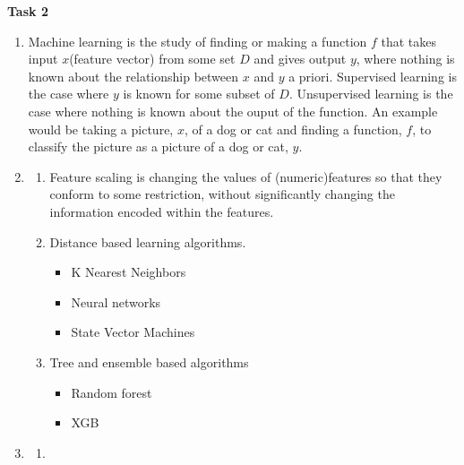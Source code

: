 {\large \bf Task 2}
\begin{enumerate}
  \item Machine learning is the study of finding or making a function $f$ that takes input $x$(feature vector) from some set $D$ and gives output $y$, where nothing is known about the relationship between $x$ and $y$ a priori.
        Supervised learning is the case where $y$ is known for some subset of $D$.
        Unsupervised learning is the case where nothing is known about the ouput of the function.
        An example would be taking a picture, $x$, of a dog or cat and finding a function, $f$, to classify the picture as a picture of a dog or cat, $y$.
  \item
      \begin{enumerate}
        \item Feature scaling is changing the values of (numeric)features so that they conform to some restriction, without significantly changing the information encoded within the features.
        \item Distance based learning algorithms.
          \begin{itemize}
            \item K Nearest Neighbors
            \item Neural networks
            \item State Vector Machines
          \end{itemize}
        \item Tree and ensemble based algorithms
          \begin{itemize}
            \item Random forest
            \item XGB
          \end{itemize}
      \end{enumerate}
    \item
      \begin{enumerate}
        \item
          \begin{minipage}[t]{0.9\textwidth}
            \centering
\end{minipage}
\end{enumerate}
\end{enumerate}
